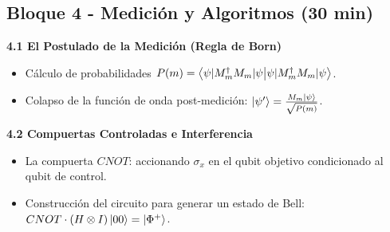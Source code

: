 \documentclass[12pt, a4paper]{article}
\begin{document}
\subsection*{Bloque 4 - Medición y Algoritmos (30 min)}
\textbf{4.1 El Postulado de la Medición (Regla de Born)}
\begin{itemize}
    \item Cálculo de probabilidades $P(m) = \braket{\psi | M_m^\dagger M_m | \psi}$.
    \item Colapso de la función de onda post-medición: $\ket{\psi'} = \frac{M_m\ket{\psi}}{\sqrt{P(m)}}$.
\end{itemize}

\textbf{4.2 Compuertas Controladas e Interferencia}
\begin{itemize}
    \item La compuerta $CNOT$: accionando $\sigma_x$ en el qubit objetivo condicionado al qubit de control.
    \item Construcción del circuito para generar un estado de Bell: $CNOT \cdot (H \otimes I) \ket{00} = \ket{\Phi^+}$.
\end{itemize}
\end{document}
